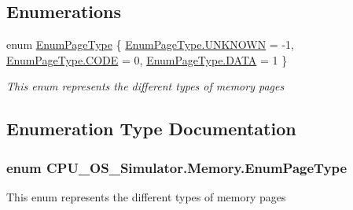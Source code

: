 \subsection*{Enumerations}
\begin{DoxyCompactItemize}
\item 
enum \hyperlink{namespace_c_p_u___o_s___simulator_1_1_memory_ab520cb14a9b6f052e02444d0397049aa}{Enum\+Page\+Type} \{ \hyperlink{namespace_c_p_u___o_s___simulator_1_1_memory_ab520cb14a9b6f052e02444d0397049aaa696b031073e74bf2cb98e5ef201d4aa3}{Enum\+Page\+Type.\+U\+N\+K\+N\+O\+W\+N} = -\/1, 
\hyperlink{namespace_c_p_u___o_s___simulator_1_1_memory_ab520cb14a9b6f052e02444d0397049aaa08054846bbc9933fd0395f8be516a9f9}{Enum\+Page\+Type.\+C\+O\+D\+E} = 0, 
\hyperlink{namespace_c_p_u___o_s___simulator_1_1_memory_ab520cb14a9b6f052e02444d0397049aaae44f9e348e41cb272efa87387728571b}{Enum\+Page\+Type.\+D\+A\+T\+A} = 1
 \}\begin{DoxyCompactList}\small\item\em This enum represents the different types of memory pages \end{DoxyCompactList}
\end{DoxyCompactItemize}


\subsection{Enumeration Type Documentation}
\hypertarget{namespace_c_p_u___o_s___simulator_1_1_memory_ab520cb14a9b6f052e02444d0397049aa}{}
\subsubsection[{Enum\+Page\+Type}]{\setlength{\rightskip}{0pt plus 5cm}enum {\bf C\+P\+U\+\_\+\+O\+S\+\_\+\+Simulator.\+Memory.\+Enum\+Page\+Type}\hspace{0.3cm}{\ttfamily [strong]}}\label{namespace_c_p_u___o_s___simulator_1_1_memory_ab520cb14a9b6f052e02444d0397049aa}


This enum represents the different types of memory pages 

